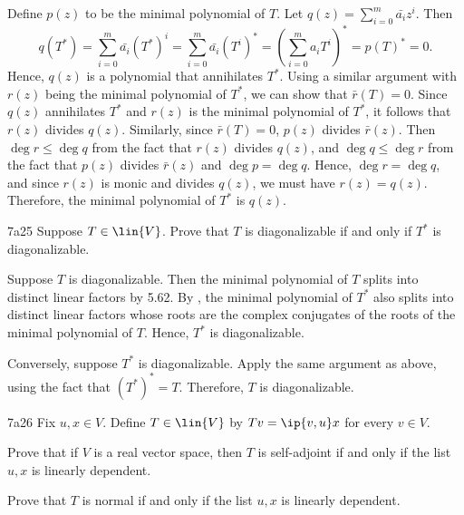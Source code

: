 \begin{sol}
    Define $p(z)$ to be the minimal polynomial of $T$.
    Let $q(z) = \sum_{i=0}^m \bar{a_i} z^i$.
    Then
    \[
        q(T^\ast) = \sum_{i=0}^m \bar{a_i} (T^\ast)^i = \sum_{i=0}^m \bar{a_i} (T^i)^\ast = \left( \sum_{i=0}^m a_i T^i \right)^\ast = p(T)^\ast = 0.
    \]
    Hence, $q(z)$ is a polynomial that annihilates $T^\ast$.
    Using a similar argument with $r(z)$ being the minimal polynomial of $T^\ast$, we can show that $\bar r(T) = 0$.
    Since $q(z)$ annihilates $T^\ast$ and $r(z)$ is the minimal polynomial of $T^\ast$, it follows that $r(z)$ divides $q(z)$.
    Similarly, since $\bar r(T) = 0$, $p(z)$ divides $\bar r(z)$.
    Then $\deg r \leq \deg q$ from the fact that $r(z)$ divides $q(z)$, and $\deg q \leq \deg r$ from the fact that $p(z)$ divides $\bar r(z)$ and $\deg p = \deg q$.
    Hence, $\deg r = \deg q$, and since $r(z)$ is monic and divides $q(z)$, we must have $r(z) = q(z)$.
    Therefore, the minimal polynomial of $T^\ast$ is $q(z)$.
\end{sol}

\begin{exercise}{7a25}
    Suppose $T \in \lin{V}$.
    Prove that $T$ is diagonalizable if and only if $T^\ast$ is diagonalizable.
\end{exercise}

\begin{soliff}
    \rightimp Suppose $T$ is diagonalizable.
    Then the minimal polynomial of $T$ splits into distinct linear factors by 5.62.
    By , the minimal polynomial of $T^\ast$ also splits into distinct linear factors whose roots are the complex conjugates of the roots of the minimal polynomial of $T$.
    Hence, $T^\ast$ is diagonalizable.

    \leftimp Conversely, suppose $T^\ast$ is diagonalizable.
    Apply the same argument as above, using the fact that $(T^\ast)^\ast = T$.
    Therefore, $T$ is diagonalizable.
\end{soliff}

\begin{exercise}{7a26}
    Fix $u, x \in V$.
    Define $T \in \lin{V}$ by $Tv = \ip{v, u}x$ for every $v \in V$.
    \begin{subexercises}
        \item Prove that if $V$ is a real vector space, then $T$ is self-adjoint if and only if the list $u, x$ is linearly dependent.
        \item Prove that $T$ is normal if and only if the list $u, x$ is linearly dependent.
    \end{subexercises}
\end{exercise}

